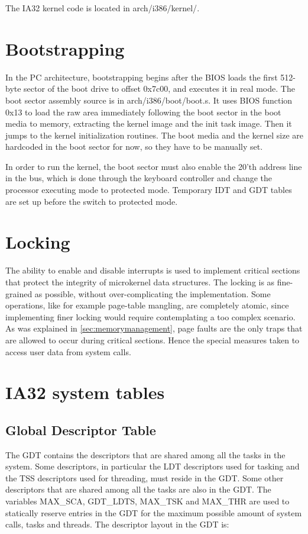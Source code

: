 \documentclass[11pt, letterpaper, twoside, english]{book}
\begin{document}
The IA32 kernel code is located in \textsf{arch/i386/kernel/}.

\section{Bootstrapping}

In the PC architecture, bootstrapping begins after the BIOS loads the first 512-byte sector of the boot drive to offset 0x7c00, and executes it in real mode. The boot sector assembly source is in \textsf{arch/i386/boot/boot.s}. It uses BIOS function 0x13 to load the raw area immediately following the boot sector in the boot media to memory, extracting the kernel image and the init task image. Then it jumps to the kernel initialization routines. The boot media and the kernel size are hardcoded in the boot sector for now, so they have to be manually set.

In order to run the kernel, the boot sector must also enable the 20'th address line in the bus, which is done through the keyboard controller and change the processor executing mode to protected mode. Temporary IDT and GDT tables are set up before the switch to protected mode.

\section{Locking}

The ability to enable and disable interrupts is used to implement critical sections that protect the integrity of microkernel data structures. The locking is as fine-grained as possible, without over-complicating the implementation. Some operations, like for example page-table mangling, are completely atomic, since implementing finer locking would require contemplating a too complex scenario. As was explained in \ref{sec:memorymanagement}, page faults are the only traps that are allowed to occur during critical sections. Hence the special measures taken to access user data from system calls.

\section{IA32 system tables}

\subsection{Global Descriptor Table}  \label{subsec:GDT}

The GDT contains the descriptors that are shared among all the tasks in the system. Some descriptors, in particular the LDT descriptors used for tasking and the TSS descriptors used for threading, must reside in the GDT. Some other descriptors that are shared among all the tasks are also in the GDT. The variables \textsf{MAX\_SCA}, \textsf{GDT\_LDTS}, \textsf{MAX\_TSK} and \textsf{MAX\_THR} are used to statically reserve entries in the GDT for the maximum possible amount of system calls, tasks and threads. The descriptor layout in the GDT is: \\
\\
\end{document}
